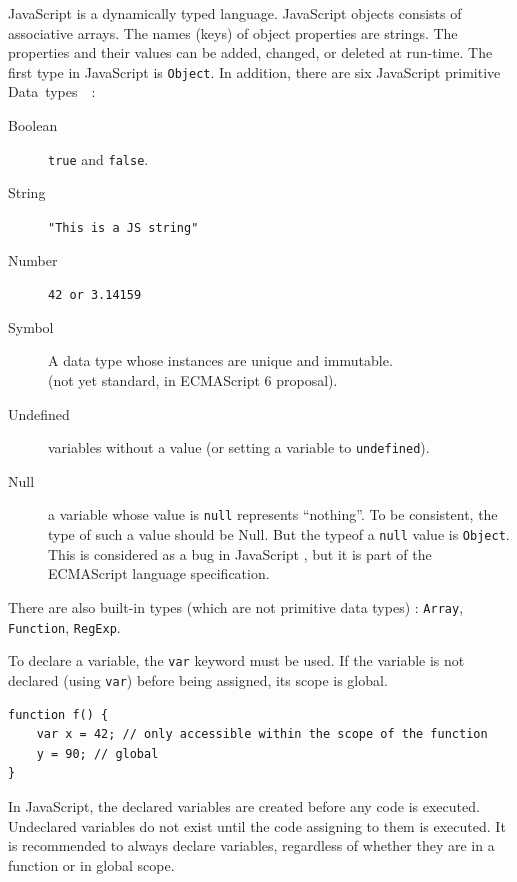 \documentclass[a4paper,10pt]{article}
\begin{document}
JavaScript is a dynamically typed language.
JavaScript objects consists of associative arrays.
The names (keys) of object properties are strings.
The properties and their values can be added, changed, or deleted at run-time.
The first type in JavaScript is \lstinline[basicstyle=\small\ttfamily]|Object|.
In addition, there are six JavaScript primitive \mbox{Data types \cite{js:datatypes} :}
\begin{description}
\item[Boolean] \lstinline|true| and \lstinline|false|.

\item[String] \lstinline|"This is a JS string"|

\item[Number] \lstinline|42 or 3.14159|

\item[Symbol] A data type whose instances are unique and immutable. \\
			(not yet standard, in ECMAScript 6 proposal).

\item[Undefined] variables without a value (or setting a variable to \lstinline|undefined|).
\item[Null] a variable whose value is \lstinline|null| represents ``nothing''. To be consistent, the type of such a value should be Null. But the typeof a \lstinline|null| value is \lstinline|Object|. This is considered as a bug in JavaScript \cite{js:null}, but it is part of the ECMAScript language specification.
\end{description}

There are also built-in types (which are not primitive data types) : \lstinline|Array|, \lstinline|Function|, \lstinline|RegExp|.

To declare a variable, the \lstinline|var| keyword must be used.
If the variable is not declared (using \lstinline|var|) before being assigned, its scope is global.

\begin{lstlisting}
function f() {
	var x = 42; // only accessible within the scope of the function
	y = 90; // global
}
\end{lstlisting}

In JavaScript, the declared variables are created before any code is executed. Undeclared variables do not exist until the code assigning to them is executed.
It is recommended to always declare variables, regardless of whether they are in a function or in global scope.
\end{document}
